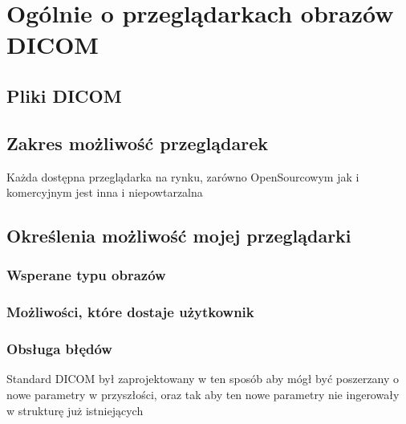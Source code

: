 
\section{Ogólnie o przeglądarkach obrazów DICOM}

\subsection{Pliki DICOM}

\subsection{Zakres możliwość przeglądarek}

Każda dostępna przeglądarka na rynku, zarówno OpenSourcowym jak i komercyjnym jest inna i niepowtarzalna 

\subsection{Określenia możliwość mojej przeglądarki}

\subsubsection{Wsperane typu obrazów}

\subsubsection{Możliwości, które dostaje użytkownik}

\subsubsection{Obsługa błędów}

Standard DICOM był zaprojektowany w ten sposób aby mógł być poszerzany o nowe parametry w przyszłości, oraz tak aby ten nowe parametry nie ingerowały w strukturę już istniejących

